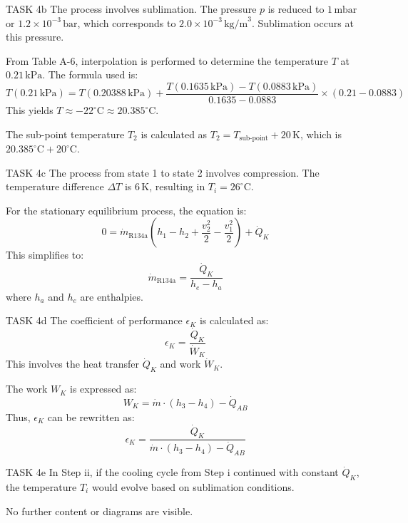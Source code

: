 TASK 4b  
The process involves sublimation. The pressure \( p \) is reduced to \( 1 \, \text{mbar} \) or \( 1.2 \times 10^{-3} \, \text{bar} \), which corresponds to \( 2.0 \times 10^{-3} \, \text{kg/m}^3 \). Sublimation occurs at this pressure.  

From Table A-6, interpolation is performed to determine the temperature \( T \) at \( 0.21 \, \text{kPa} \). The formula used is:  
\[
T(0.21 \, \text{kPa}) = T(0.20388 \, \text{kPa}) + \frac{T(0.1635 \, \text{kPa}) - T(0.0883 \, \text{kPa})}{0.1635 - 0.0883} \times (0.21 - 0.0883)
\]  
This yields \( T \approx -22^\circ\text{C} \approx 20.385^\circ\text{C} \).  

The sub-point temperature \( T_2 \) is calculated as \( T_2 = T_{\text{sub-point}} + 20 \, \text{K} \), which is \( 20.385^\circ\text{C} + 20^\circ\text{C} \).  

TASK 4c  
The process from state 1 to state 2 involves compression. The temperature difference \( \Delta T \) is \( 6 \, \text{K} \), resulting in \( T_i = 26^\circ\text{C} \).  

For the stationary equilibrium process, the equation is:  
\[
0 = \dot{m}_{\text{R134a}} \left( h_1 - h_2 + \frac{v_2^2}{2} - \frac{v_1^2}{2} \right) + \dot{Q}_K
\]  
This simplifies to:  
\[
\dot{m}_{\text{R134a}} = \frac{\dot{Q}_K}{h_e - h_a}
\]  
where \( h_a \) and \( h_e \) are enthalpies.  

TASK 4d  
The coefficient of performance \( \epsilon_K \) is calculated as:  
\[
\epsilon_K = \frac{\dot{Q}_K}{\dot{W}_K}
\]  
This involves the heat transfer \( \dot{Q}_K \) and work \( \dot{W}_K \).  

The work \( W_K \) is expressed as:  
\[
W_K = \dot{m} \cdot \left( h_3 - h_4 \right) - \dot{Q}_{AB}
\]  
Thus, \( \epsilon_K \) can be rewritten as:  
\[
\epsilon_K = \frac{\dot{Q}_K}{\dot{m} \cdot \left( h_3 - h_4 \right) - \dot{Q}_{AB}}
\]  

TASK 4e  
In Step ii, if the cooling cycle from Step i continued with constant \( \dot{Q}_K \), the temperature \( T_i \) would evolve based on sublimation conditions.  

No further content or diagrams are visible.